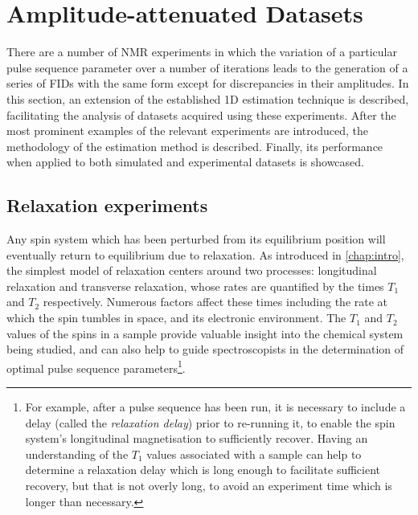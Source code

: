 \section{Amplitude-attenuated Datasets}
\label{sec:seq}
There are a number of \ac{NMR} experiments in which the
variation of a particular pulse sequence parameter over a number of iterations
leads to the generation of a series of
\acp{FID} with the same form except for discrepancies in their amplitudes.
In this section, an extension of the established \ac{1D} estimation
technique is described, facilitating the analysis of datasets acquired using
these experiments.
After the most prominent examples of the relevant experiments are
introduced, the methodology of the estimation method is described.
Finally, its performance when applied to both simulated and experimental
datasets is showcased.

\subsection{Relaxation experiments}
\label{subsec:relaxation_experiments}
Any spin system which has been perturbed from its equilibrium position will
eventually return to equilibrium due to relaxation. As introduced in
\cref{chap:intro}, the simplest model of relaxation centers around two
processes: longitudinal relaxation and transverse relaxation, whose rates are
quantified by the times $T_1$ and  $T_2$ respectively.
Numerous factors affect these times  including the rate at which the spin
tumbles in space, and its electronic environment.
The $T_1$ and $T_2$ values of the spins in a sample provide valuable insight
into the chemical system being studied, and can also help to guide
spectroscopists in the determination of optimal pulse sequence
parameters\footnote{
    For example, after a pulse sequence has been run, it is necessary to include a
    delay (called the \emph{relaxation delay}) prior to
    re-running it, to enable the spin system's longitudinal magnetisation to
    sufficiently recover. Having an understanding of the $T_1$ values
    associated with a sample can help to determine a relaxation delay which is
    long enough to facilitate sufficient recovery, but that is not overly long, to
    avoid an experiment time which is longer than necessary.
}.

